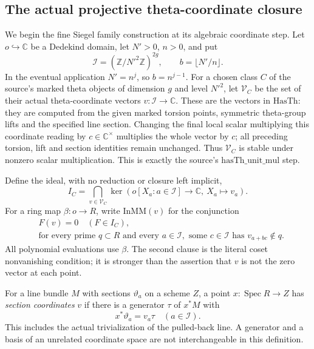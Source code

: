 \subsection{The actual projective theta-coordinate closure}
\label{subsec:ftb-theta-coordinate-closure}

We begin the fine Siegel family construction at its algebraic
coordinate step.
Let \(o\hookrightarrow\mathbb C\) be a Dedekind domain, let
\(N'>0\), \(n>0\), and put
\[
 \mathcal I=(\mathbb Z/N'^2\mathbb Z)^{2g},\qquad
                              b=\lfloor N'/n\rfloor .
\]
In the eventual application \(N'=n^j\), so \(b=n^{j-1}\).
For a chosen class \(C\) of the source's marked theta objects
of dimension \(g\) and level \(N'^2\), let \(\mathcal V_C\)
be the set of their actual theta-coordinate vectors
\(v:\mathcal I\to\mathbb C\).
These are the vectors in \(\mathrm{HasTh}\): they are
computed from the given marked torsion points, symmetric
theta-group lifts and the specified line section.
Changing the final local scalar multiplying this coordinate
reading by \(c\in\mathbb C^\times\) multiplies the whole
vector by \(c\); all preceding torsion, lift and section
identities remain unchanged.
Thus \(\mathcal V_C\) is stable under nonzero scalar
multiplication.  This is exactly the source's
\(\mathrm{hasTh\_unit\_mul}\) step.

Define the ideal, with no reduction or closure left implicit,
\[
 I_C=\bigcap_{v\in\mathcal V_C}
       \ker\!\left(o[X_a:a\in\mathcal I]\longrightarrow\mathbb C,
                                      \ X_a\longmapsto v_a\right).
 \tag{M1}\label{eq:ftb-theta-vanishing-ideal}
\]
For a ring map \(\beta:o\to R\), write \(\mathrm{InMM}(v)\)
for the conjunction
\[
 \begin{split}
 &F(v)=0\quad(F\in I_C),\\
 &\text{for every prime }q\subset R\text{ and every }a\in\mathcal I,
          \text{ some }c\in\mathcal I
                         \text{ has }v_{a+bc}\notin q.
 \end{split}
 \tag{M2}\label{eq:ftb-theta-inmm}
\]
All polynomial evaluations use \(\beta\).
The second clause is the literal coset nonvanishing condition;
it is stronger than the assertion that \(v\) is not the zero
vector at each point.

For a line bundle \(M\) with sections \(\vartheta_a\) on a
scheme \(Z\), a point \(x:\operatorname{Spec}R\to Z\) has
\emph{section coordinates} \(v\) if there is a generator
\(\tau\) of \(x^*M\) with
\[
                                x^*\vartheta_a=v_a\tau
                                      \quad(a\in\mathcal I).
 \tag{M3}\label{eq:ftb-theta-section-coordinates}
\]
This includes the actual trivialization of the pulled-back
line.  A generator and a basis of an unrelated coordinate
space are not interchangeable in this definition.

